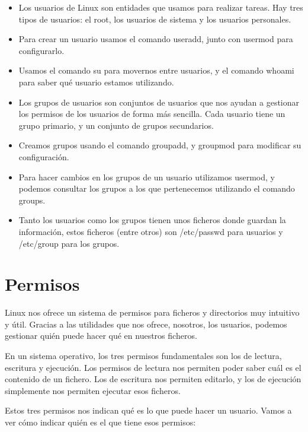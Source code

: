 \begin{itemize}
    \item Los usuarios de Linux son entidades que usamos para realizar tareas. Hay tres tipos de usuarios: el root, los usuarios de sistema y los usuarios personales.

    \item Para crear un usuario usamos el comando useradd, junto con usermod para configurarlo.

    \item Usamos el comando su para movernos entre usuarios, y el comando whoami para saber qué usuario estamos utilizando.

    \item Los grupos de usuarios son conjuntos de usuarios que nos ayudan a gestionar los permisos de los usuarios de forma más sencilla. Cada usuario tiene un grupo primario, y un conjunto de grupos secundarios.

    \item Creamos grupos usando el comando groupadd, y groupmod para modificar su configuración.

    \item Para hacer cambios en los grupos de un usuario utilizamos usermod, y podemos consultar los grupos a los que pertenecemos utilizando el comando groups.

    \item Tanto los usuarios como los grupos tienen unos ficheros donde guardan la información, estos ficheros (entre otros) son /etc/passwd para usuarios y /etc/group para los grupos.
\end{itemize}

\section{Permisos}
Linux nos ofrece un sistema de permisos para ficheros y directorios muy intuitivo y útil. Gracias a las utilidades que nos ofrece, nosotros, los usuarios, podemos gestionar quién puede hacer qué en nuestros ficheros.

En un sistema operativo, los tres permisos fundamentales son los de lectura, escritura y ejecución. Los permisos de lectura nos permiten poder saber cuál es el contenido de un fichero. Los de escritura nos permiten editarlo, y los de ejecución simplemente nos permiten ejecutar esos ficheros.

Estos tres permisos nos indican qué es lo que puede hacer un usuario. Vamos a ver cómo indicar quién es el que tiene esos permisos:

